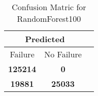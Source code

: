\begin{table}[] 
\caption{Confusion Matric for RandomForest100} 
\label{Table: Prediction Accuracy-DMDRandomForest100OnlySunEKF-resetReflectionperfectNoFailurePrediction-Reflection} 
\centering 
\begin{tabular} 
 {@{}ccc@{}} 
\toprule 
\multicolumn{2}{c}{\textbf{Predicted}}
 \\ \midrule 
\multicolumn{1}{|c|}{Failure} & 
\multicolumn{1}{c|}{No Failure}
 \\ \midrule 
\multicolumn{1}{|c|}{\color{green}\textbf{125214}} & 
\multicolumn{1}{c|}{\color{red}\textbf{0}}
 \\ \midrule 
\multicolumn{1}{|c|}{\color{red}\textbf{19881}} & 
\multicolumn{1}{c|}{\color{green}\textbf{25033}}
 \\ \bottomrule 
\end{tabular} 
\end{table} 
